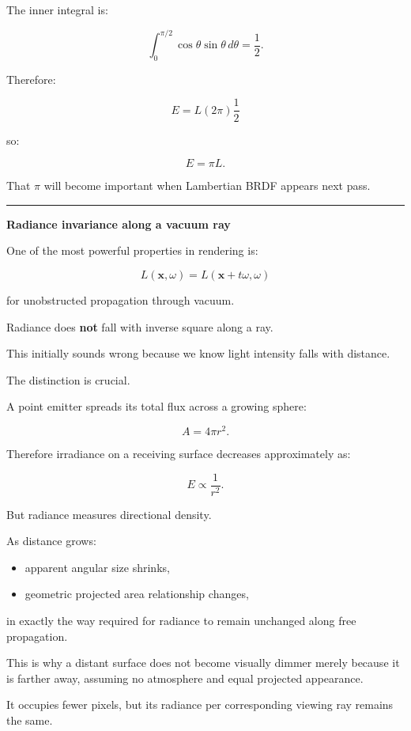 The inner integral is:

\[
\int_0^{\pi/2}
\cos\theta\sin\theta\,d\theta
=
\frac12.
\]

Therefore:

\[
E=
L(2\pi)\frac12
\]

so:

\[
\boxed{
E=\pi L.
}
\]

That \(\pi\) will become important when Lambertian BRDF appears next pass.

\begin{center}\rule{0.5\linewidth}{0.5pt}\end{center}

\textbf{Radiance invariance along a vacuum ray}

One of the most powerful properties in rendering is:

\[
\boxed{
L(\mathbf x,\omega)
=
L(\mathbf x+t\omega,\omega)
}
\]

for unobstructed propagation through vacuum.

Radiance does \textbf{not} fall with inverse square along a ray.

This initially sounds wrong because we know light intensity falls with distance.

The distinction is crucial.

A point emitter spreads its total flux across a growing sphere:

\[
A=4\pi r^2.
\]

Therefore irradiance on a receiving surface decreases approximately as:

\[
E\propto\frac1{r^2}.
\]

But radiance measures directional density.

As distance grows:

\begin{itemize}
\tightlist
\item
  apparent angular size shrinks,
\item
  geometric projected area relationship changes,
\end{itemize}

in exactly the way required for radiance to remain unchanged along free propagation.

This is why a distant surface does not become visually dimmer merely because it is farther away, assuming no atmosphere and equal projected appearance.

It occupies fewer pixels, but its radiance per corresponding viewing ray remains the same.

